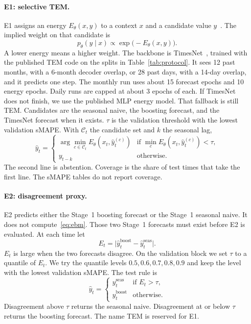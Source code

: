 \paragraph{E1: selective TEM.}
E1 assigns an energy $E_{\theta}(x, y)$ to a context $x$ and a candidate value $y$~\citep{brusokas2025tem}.
The implied weight on that candidate is
\begin{equation}
  p_{\theta}(y \mid x) \propto \exp\bigl(-E_{\theta}(x, y)\bigr).
  \label{eq:ebm}
\end{equation}
A lower energy means a higher weight.
The backbone is TimesNet~\citep{wu2023timesnet}, trained with the published TEM code on the splits in Table~\ref{tab:protocol}.
It sees 12 past months, with a 6-month decoder overlap, or 28 past days, with a 14-day overlap, and it predicts one step.
The monthly run uses about 15 forecast epochs and 10 energy epochs.
Daily runs are capped at about 3 epochs of each.
If TimesNet does not finish, we use the published MLP energy model.
That fallback is still TEM.
Candidates are the seasonal naive, the boosting forecast, and the TimesNet forecast when it exists.
$\tau$ is the validation threshold with the lowest validation sMAPE.
With $\mathcal{C}_t$ the candidate set and $k$ the seasonal lag,
\begin{equation}
  \hat y_t =
  \begin{cases}
    \arg\min_{c \in \mathcal{C}_t} E_{\theta}(x_t, \hat y_t^{(c)})
      & \text{if }\min_{c} E_{\theta}(x_t, \hat y_t^{(c)}) \lt \tau, \\[4pt]
    y_{t-k}
      & \text{otherwise.}
  \end{cases}
  \label{eq:tem}
\end{equation}
The second line is abstention.
Coverage is the share of test times that take the first line.
The sMAPE tables do not report coverage.

\paragraph{E2: disagreement proxy.}
E2 predicts either the Stage~1 boosting forecast or the Stage~1 seasonal naive.
It does not compute~\eqref{eq:ebm}.
Those two Stage~1 forecasts must exist before E2 is evaluated.
At each time let
\begin{equation}
  E_t = \bigl|\hat y_t^{\mathrm{boost}} - \hat y_t^{\mathrm{seas}}\bigr|.
  \label{eq:proxy}
\end{equation}
$E_t$ is large when the two forecasts disagree.
On the validation block we set $\tau$ to a quantile of $E_t$.
We try the quantile levels $0.5, 0.6, 0.7, 0.8, 0.9$ and keep the level with the lowest validation sMAPE.
The test rule is
\begin{equation}
  \hat y_t =
  \begin{cases}
    \hat y_t^{\mathrm{seas}} & \text{if } E_t \gt \tau, \\
    \hat y_t^{\mathrm{boost}} & \text{otherwise.}
  \end{cases}
  \label{eq:proxy-rule}
\end{equation}
Disagreement above $\tau$ returns the seasonal naive.
Disagreement at or below $\tau$ returns the boosting forecast.
The name TEM is reserved for E1.

